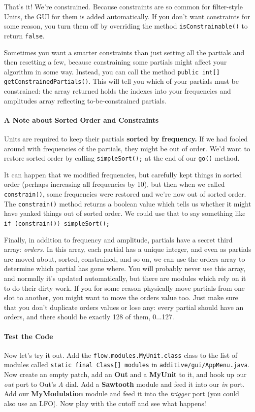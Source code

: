 \documentclass{article}
\begin{document}
That's it!  We're constrained.  Because constraints are so common for filter-style Units, the GUI for them is added automatically.  If you don't want constraints for some reason, you turn them off by overriding the method {\tt isConstrainable()} to return {\tt false}.

Sometimes you want a smarter constraints than just setting all the partials and then resetting a few, because constraining some partials might affect your algorithm in some way.  Instead, you can call the method {\tt public int[] getConstrainedPartials()}.  This will tell you which of your partials must be constrained: the array returned holds the indexes into your frequencies and amplitudes array reflecting to-be-constrained partials.

\paragraph{A Note about Sorted Order and Constraints} 

Units are required to keep their partials {\bf sorted by frequency.}  If we had fooled around with frequencies of the partials, they might be out of order.  We'd want to restore sorted order by calling {\tt simpleSort();} at the end of our {\tt go()} method.

It can happen that we modified frequencies, but carefully kept things in sorted order (perhaps increasing all frequencies by 10), but then when we called {\tt constrain()}, some frequencies were restored and we're now out of sorted order.  The {\tt constrain()} method returns a boolean value which tells us whether it might have yanked things out of sorted order.  We could use that to say something like \hbox{\tt if (constrain()) simpleSort(); }

Finally, in addition to frequency and amplitude, partials have a secret third array: {\it orders}.  In this array, each partial has a unique integer, and even as partials are moved about, sorted, constrained, and so on, we can use the orders array to determine which partial has gone where.  You will probably never use this array, and normally it's updated automatically, but there are modules which rely on it to do their dirty work.  If you for some reason physically move partials from one slot to another, you might want to move the orders value too.  Just make sure that you don't duplicate orders values or lose any: every partial should have an orders, and there should be exactly 128 of them, 0...127.

\paragraph{Test the Code}
Now let's try it out.  Add the {\tt flow.modules.MyUnit.class} class to the list of modules called {\tt static final Class[] modules} in 
 {\tt additive/gui/AppMenu.java}.  Now create an empty patch, add an {\bf Out} and a {\bf MyUnit} to it, and hook up our {\it out} port to Out's {\it A} dial.  Add a {\bf Sawtooth} module and feed it into our {\it in} port.  Add our {\bf MyModulation} module and feed it into the {\it trigger} port (you could also use an LFO).  Now play with the cutoff and see what happens!
\end{document}
